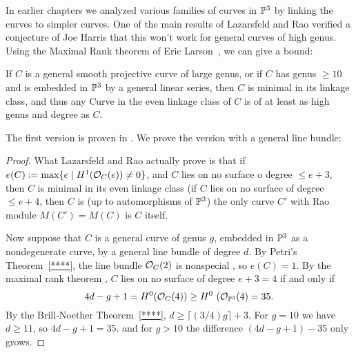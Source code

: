 In earlier chapters we analyzed various families of curves in ${\mathbb P}^3$ by linking the curves to simpler curves. One of the main
results of Lazarsfeld and Rao verified a conjecture of Joe Harris that this won't work for general curves of high genus.
Using the Maximal Rank theorem of Eric Larson~\cite{Larson}, we can give a bound:

\begin{theorem}
If $C$ is a general smooth projective curve of large genus, or if $C$ has genus $\geq 10$ and is embedded in ${\mathbb P}^3$ by a general linear series,
then $C$ is minimal in its linkage class, and thus any Curve in the even linkage class of $C$ is of at least as high genus and degree as $C$.
\end{theorem}


The first version is proven in \cite{Lazarsfeld-Rao}. We prove the version with a general line bundle:
\begin{proof}
What Lazarsfeld and Rao actually prove is that if $e(C) := \max\{e \mid H^1({\mathcal O}_C(e)) \neq 0\}$, and $C$ lies on no surface o degree $\leq e+3$, then $C$ is minimal in its even linkage class (if $C$ lies on no surface of degree $\leq e+4$, then $C$ is (up to automorphisms of 
${\mathbb P}^3$) the only curve $C'$ with Rao module $M(C') = M(C)$ is $C$ itself.

Now suppose that $C$ is a general curve of genus $g$, embedded in ${\mathbb P}^3$ as a nondegenerate curve,
by a general line bundle of degree $d$.
 By Petri's Theorem~\ref{****},
the line bundle ${\mathcal O}_C(2)$ is nonspecial , so $e(C) =1$. By the maximal rank theorem \cite{Larson},
$C$ lies on no surface of degree $e+3 = 4$ if and only if 
$$
4d-g+1 = H^0(\sO_C(4)) \geq H^0 (\sO_{\PP^3}(4) = 35.
$$ 
By the Brill-Noether Theorem~\ref{****},  $d\geq\lceil (3/4)g\rceil+3$.
For $g = 10$ we have $d\geq 11$, so $4d-g+1 = 35$.
and for $g>10$ the difference $(4d-g+1)-35$ only grows.
\end{proof}

